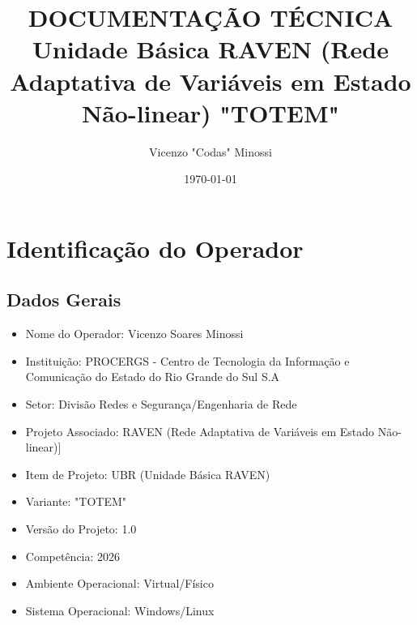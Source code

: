 \documentclass[12pt,a4paper]{article}
\title{
    \Huge \textbf{DOCUMENTAÇÃO TÉCNICA}\\[0.4cm]
    \Large Unidade Básica RAVEN (Rede Adaptativa de Variáveis em Estado Não-linear) "TOTEM"
}
\author{
    Vicenzo "Codas" Minossi
}
\date{\today}
\begin{document}
\maketitle

\vspace{1cm}

\tableofcontents

\newpage


\section{Identificação do Operador}

\subsection{Dados Gerais}

\begin{itemize}

    \item Nome do Operador: Vicenzo Soares Minossi
    \item Instituição: PROCERGS - Centro de Tecnologia da Informação e Comunicação do Estado do Rio Grande do Sul S.A
    \item Setor: Divisão Redes e Segurança/Engenharia de Rede
    \item Projeto Associado: RAVEN (Rede Adaptativa de Variáveis em Estado Não-linear)]
    \item Item de Projeto: UBR (Unidade Básica RAVEN)
    \item Variante: "TOTEM"
    \item Versão do Projeto: 1.0
    \item Competência: 2026
    \item Ambiente Operacional: Virtual/Físico
    \item Sistema Operacional: Windows/Linux

\end{itemize}

\vspace{0.5cm}

\end{document}
